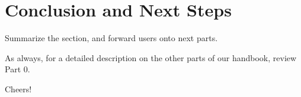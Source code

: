 \genHeader
\section{Conclusion and Next Steps}
\hypertarget{conclusion}{}

Summarize the section, and forward users onto next parts.

As always, for a detailed description on the other parts of our handbook, review Part 0.

Cheers!